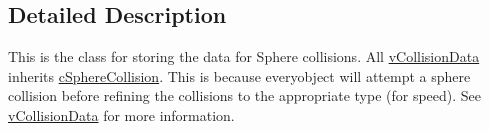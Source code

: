 \subsection{Detailed Description}
This is the class for storing the data for Sphere collisions. All \hyperlink{classv_collision_data}{vCollisionData} inherits \hyperlink{classc_sphere_collision}{cSphereCollision}. This is because everyobject will attempt a sphere collision before refining the collisions to the appropriate type (for speed). See \hyperlink{classv_collision_data}{vCollisionData} for more information. 